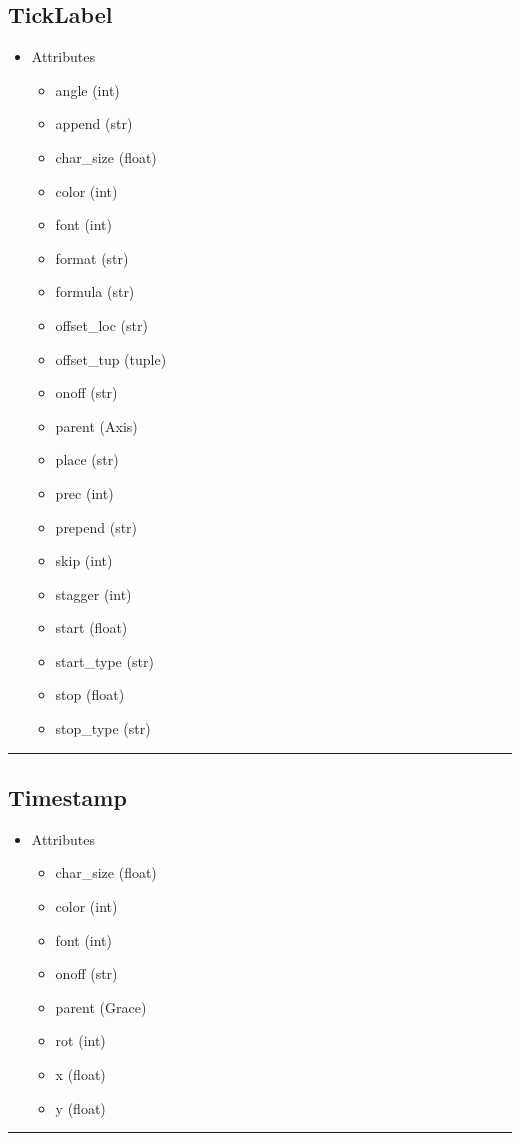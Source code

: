 \documentclass[10pt]{article}
\begin{document}
\begin{multicols}{4}
\subsection*{\footnotesize TickLabel}
\begin{itemize}
\item Attributes
\begin{itemize}
\item angle (int)
\item append (str)
\item char\_size (float)
\item color (int)
\item font (int)
\item format (str)
\item formula (str)
\item offset\_loc (str)
\item offset\_tup (tuple)
\item onoff (str)
\item parent (Axis)
\item place (str)
\item prec (int)
\item prepend (str)
\item skip (int)
\item stagger (int)
\item start (float)
\item start\_type (str)
\item stop (float)
\item stop\_type (str)
\end{itemize}
\end{itemize}
\vspace{0.5em}
\hrule
\vspace{0.1em}
\subsection*{\footnotesize Timestamp}
\begin{itemize}
\item Attributes
\begin{itemize}
\item char\_size (float)
\item color (int)
\item font (int)
\item onoff (str)
\item parent (Grace)
\item rot (int)
\item x (float)
\item y (float)
\end{itemize}
\end{itemize}
\vspace{0.5em}
\hrule
\vspace{0.1em}

\end{multicols}
\end{document}
